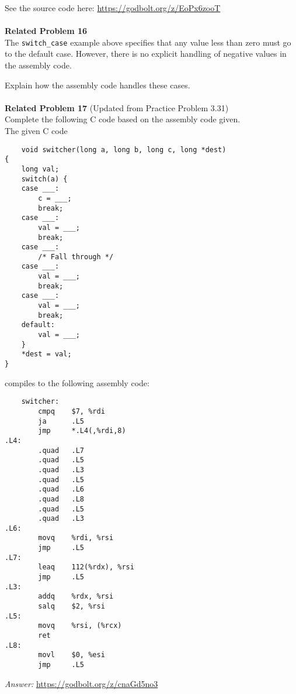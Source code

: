 See the source code here: \url{https://godbolt.org/z/EoPx6zooT} \\
\\
\clearpage
\noindent\textbf{Related Problem 16} \\
The \texttt{switch\_case} example above specifies that any value less than zero must go to the default case. However, there is no explicit handling of negative values in the assembly code. 

Explain how the assembly code handles these cases.\\ 
\\
\noindent\textbf{Related Problem 17} (Updated from Practice Problem 3.31) \\
Complete the following C code based on the assembly code given.\\
The given C code
\begin{verbatim}
    void switcher(long a, long b, long c, long *dest)
{
    long val;
    switch(a) {
    case ___:
        c = ___;
        break;
    case ___:
        val = ___;
        break;
    case ___:
        /* Fall through */
    case ___:
        val = ___;
        break;
    case ___:
        val = ___;
        break;
    default:
        val = ___; 
    }
    *dest = val; 
}
\end{verbatim}
compiles to the following assembly code:
\begin{verbatim}
    switcher:
        cmpq    $7, %rdi
        ja      .L5
        jmp     *.L4(,%rdi,8)
.L4:
        .quad   .L7
        .quad   .L5
        .quad   .L3
        .quad   .L5
        .quad   .L6
        .quad   .L8
        .quad   .L5
        .quad   .L3
.L6:
        movq    %rdi, %rsi
        jmp     .L5
.L7:
        leaq    112(%rdx), %rsi
        jmp     .L5
.L3:
        addq    %rdx, %rsi
        salq    $2, %rsi
.L5:
        movq    %rsi, (%rcx)
        ret
.L8:
        movl    $0, %esi
        jmp     .L5
\end{verbatim}

\textit{Answer: }\url{https://godbolt.org/z/cnaGd5no3}
\clearpage